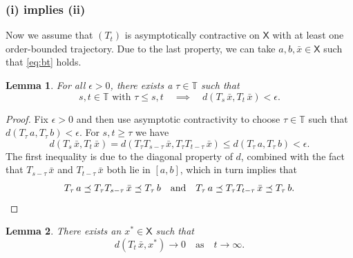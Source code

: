 \documentclass[12pt,reqno]{amsart}
\numberwithin{equation}{section}
\newtheorem{lemma}{Lemma}[section]
\theoremstyle{definition}
\newcommand{\1}{\mathbbm{1}}
\newcommand{\TT}{\mathbb T}
\newcommand{\Xsf}{\mathsf{X}}
\begin{document}
\subsubsection{(i) implies (ii)}

Now we assume that $(T_t)$ is asymptotically contractive on $\Xsf$ with at least one order-bounded trajectory.
Due to the last property, we can take $a, b, \bar x \in \Xsf$ such that
\eqref{eq:bt} holds.


\begin{lemma}\label{l:dis}
    For all $\epsilon > 0$, there exists a $\tau \in \TT$ such that
    \begin{equation}\label{eq:dis}
        s,t \in \TT \text{ with }  \tau \leq s,t
        \quad \implies \quad
        d(T_s \, \bar x, T_t \, \bar x) < \epsilon .
    \end{equation}
\end{lemma}

\begin{proof}
    Fix $\epsilon > 0$ and then use asymptotic
    contractivity to choose $\tau \in \TT$ such that $d(T_\tau \, a, T_\tau \, b) <
    \epsilon$.  For $s, t \geq \tau$ we have
    \begin{equation*}
        d(T_s \, \bar x, T_t \, \bar x)
         = d(T_\tau  T_{s - \tau} \, \bar x, T_\tau T_{t - \tau} \, \bar x)
         \leq d(T_\tau \, a, T_\tau \, b) < \epsilon.
    \end{equation*}
    The first inequality is due to the diagonal property of $d$, combined with
    the fact that $T_{s - \tau} \, \bar x$ and $T_{t - \tau} \, \bar x$ both lie in $[a, b]$,
    which in turn implies that
    \begin{equation*}
        T_\tau \, a \preceq T_\tau T_{s-\tau} \,  \bar x \preceq T_\tau\, b
        \quad \text{and} \quad
        T_\tau \, a \preceq T_\tau T_{t-\tau} \, \bar x \preceq T_\tau \, b.
        \qedhere
    \end{equation*}
\end{proof}

\begin{lemma}\label{l:conv}
    There exists an $x^* \in \Xsf$ such that
    \begin{equation}\label{eq:stall}
         d(T_t \, \bar x, x^*) \to 0
         \quad \text{as} \quad
         t \to \infty.
    \end{equation}
\end{lemma}
\end{document}
